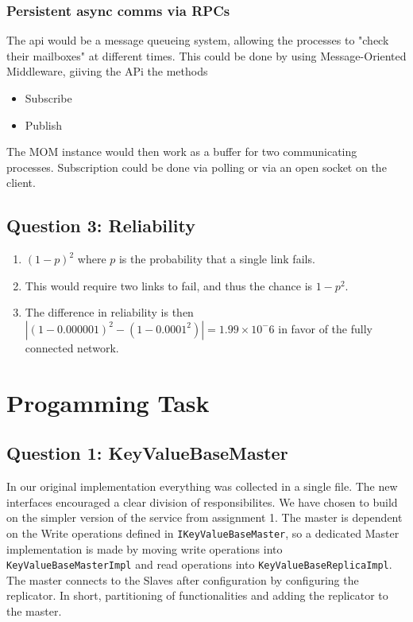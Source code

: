 \documentclass[11pt,a4paper]{article}
\begin{document}
\subsubsection{Persistent async comms via RPCs}

The api would be a message queueing system, allowing the processes to "check their mailboxes" at different times.
This could be done by using Message-Oriented Middleware, giiving the APi the methods
\begin{itemize}
\item Subscribe
\item Publish
\end{itemize}
The MOM instance would then work as a buffer for two communicating processes.
Subscription could be done via polling or via an open socket on the client.


\subsection{Question 3: Reliability}

\begin{enumerate}
  \item $(1-p)^2$ where $p$ is the probability that a single link fails.
  \item This would require two links to fail, and thus the chance is $1-p^2$.
  \item The difference in reliability is then $|(1-0.000001)^2 - (1-0.0001^2)| = 1.99 \times 10^-6$ in favor of the fully connected network.
\end{enumerate}


\section{Progamming Task}

\subsection{Question 1: KeyValueBaseMaster}
In our original implementation everything was collected in a single file. The new interfaces encouraged a clear division of responsibilites.
We have chosen to build on the simpler version of the service from assignment 1.
The master is dependent on the Write operations defined in {\tt IKeyValueBaseMaster}, so a dedicated Master implementation is made by
moving write operations into {\tt KeyValueBaseMasterImpl} and read operations into {\tt KeyValueBaseReplicaImpl}.
The master connects to the Slaves after configuration by configuring the replicator. In short, partitioning of functionalities and adding the replicator to the master.
\end{document}

